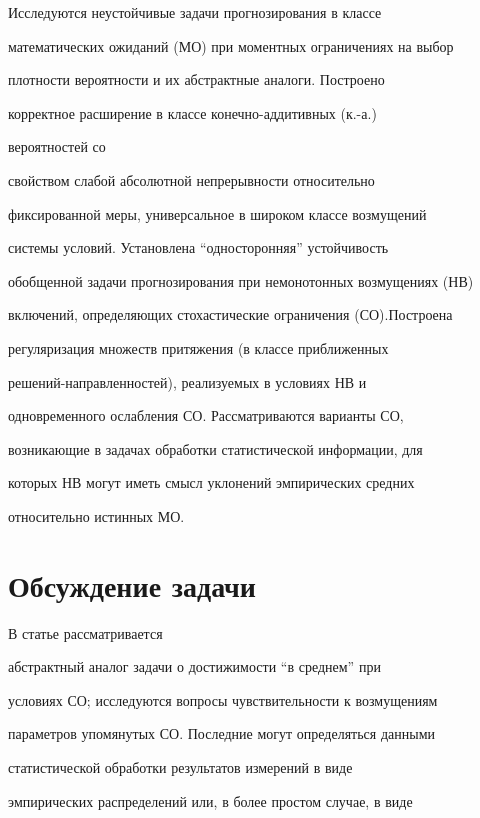 \hfuzz=2pt





Исследуются неустойчивые задачи прогнозирования в классе


математических ожиданий (МО) при моментных ограничениях на выбор


плотности вероятности и их абстрактные аналоги. Построено


корректное расширение в классе конечно-аддитивных (к.-а.)


вероятностей со


свойством слабой абсолютной непрерывности относительно


фиксированной меры, универсальное в широком классе возмущений


системы условий. Установлена ``односторонняя'' устойчивость


обобщенной задачи прогнозирования при немонотонных возмущениях (НВ)


включений, определяющих стохастические ограничения (СО).Построена


регуляризация множеств притяжения (в классе приближенных


решений-направленностей), реализуемых в условиях НВ и


одновременного ослабления СО. Рассматриваются варианты СО,


возникающие в задачах обработки статистической информации, для


которых НВ могут иметь смысл уклонений эмпирических средних


относительно истинных МО.





\section{Обсуждение задачи}





В статье рассматривается


абстрактный аналог задачи о достижимости ``в среднем'' при


условиях СО; исследуются вопросы чувствительности к возмущениям


параметров упомянутых СО. Последние могут определяться данными


статистической обработки результатов измерений в виде


эмпирических распределений или, в более простом случае, в виде


